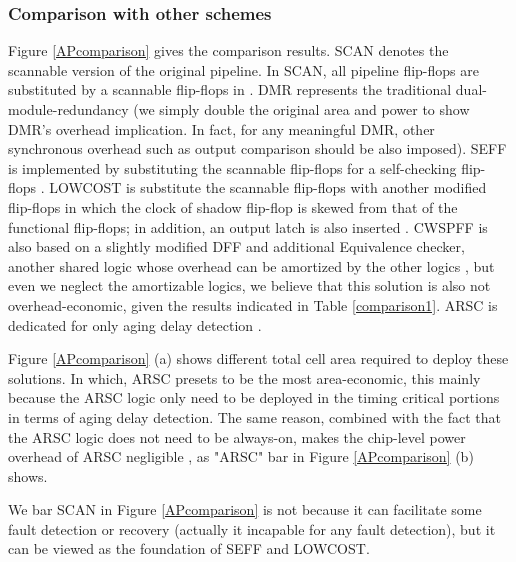 \begin{figure*}[!t]
\centering {}
\caption{Comparison with other solutions in terms of cell area and power,
$L_{xor}=4$, $L_{and}=5$, $BW=8$.} \label{APcomparison}
\end{figure*}

\subsubsection{Comparison with other schemes}
Figure \ref{APcomparison} gives the comparison results. SCAN denotes the scannable version of the original pipeline. In SCAN, all pipeline flip-flops are substituted by a scannable flip-flops in \cite{Mitra_C05}. DMR represents the traditional dual-module-redundancy (we simply double the original area and power to show DMR's overhead implication. In fact, for any meaningful DMR, other synchronous overhead such as output comparison should be also imposed). SEFF is implemented by substituting the scannable flip-flops for a self-checking flip-flops \cite{Mitra_C05}. LOWCOST is substitute the scannable flip-flops with another modified flip-flops in which the clock of shadow flip-flop is skewed from that of the functional flip-flops; in addition, an output latch is also inserted \cite{lowcost_date07}. CWSPFF is also based on a slightly modified DFF and additional Equivalence checker, another shared logic whose overhead can be amortized by the other logics \cite{CWSP_DATE08}, but even we neglect the amortizable logics, we believe that this solution is also not overhead-economic, given the results indicated in Table \ref{comparison1}. ARSC is dedicated for only aging delay detection \cite{failure_prediction_07}.

Figure \ref{APcomparison} (a) shows different total cell area required to deploy these solutions. In which, ARSC presets to be the most area-economic, this mainly because the ARSC logic only need to be deployed in the timing critical portions in terms of aging delay detection. The same reason, combined with the fact that the ARSC logic does not need to be always-on, makes the chip-level power overhead of ARSC negligible \cite{failure_prediction_07}, as "ARSC" bar in Figure \ref{APcomparison} (b) shows.

We bar SCAN in Figure \ref{APcomparison} is not because it can facilitate some fault detection or recovery (actually it incapable for any fault detection), but it can be viewed as the foundation of SEFF and LOWCOST.

